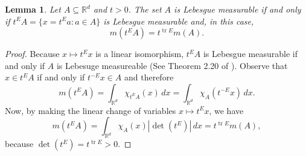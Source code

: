 \documentclass[11pt]{article}
\theoremstyle{theorem}
\newtheorem{lemma}[theorem]{Lemma}
\newcommand\tr{\operatorname{tr}}
\renewcommand\det{\operatorname{det}}
\begin{document}
\begin{lemma}\label{lemma:Scaling}
Let $A\subseteq\mathbb{R}^d$ and $t>0$. The set $A$ is Lebesgue measurable if and only if $t^E A=\{x=t^E a:a\in A\}$ is Lebesgue measurable and, in this case,
\begin{equation*}
m(t^E A)=t^{\tr E}m(A).
\end{equation*}
\end{lemma}
\begin{proof}
Because $x\mapsto t^E x$ is a linear isomorphism, $t^E A$ is Lebesgue measurable if and only if $A$ is Lebesuge measureable (See Theorem 2.20 of \cite{Rudin1987}). Observe that $x\in t^E A$ if and only if $t^{-E}x\in A$ and therefore
\begin{equation*}
m(t^E A)=\int_{\mathbb{R}^d}\chi_{t^E A}(x)\,dx=\int_{\mathbb{R}^d}\chi_{A}(t^{-E}x)\,dx.
\end{equation*}
Now, by making the linear change of variables $x\mapsto t^E x$, we have
\begin{equation*}
m(t^E A)=\int_{\mathbb{R}^d}\chi_A(x)|\det(t^E)|\,dx=t^{\tr E}m(A),
\end{equation*}
because $\det(t^E)=t^{\tr E}>0$.
\end{proof}
\end{document}
